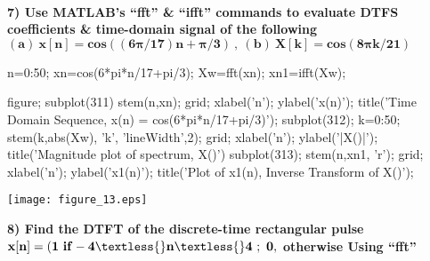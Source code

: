 \documentclass[12pt, onecolumn]{IEEEtran}
\begin{document}
\begin{par}
	\begin{flushleft}
		\textbf{ \\ 7) Use MATLAB’s “fft” \& “ifft” commands to evaluate DTFS coefficients \& time-domain signal of the following  $\mathbf{(a) \ x[n] = cos( (6\pi/17)n+\pi/3) \ , \ (b) \ X[k] = cos( 8\pi k/21 )}$}
	\end{flushleft}
\end{par}

\begin{matlabcode}
	n=0:50; %
	xn=cos(6*pi*n/17+pi/3); %
	Xw=fft(xn); %
	xn1=ifft(Xw); %
	
	figure; subplot(311)
	stem(n,xn); grid; %
	xlabel('n'); ylabel('x(n)');
	title('Time Domain Sequence, x(n) = cos(6*pi*n/17+pi/3)');
	subplot(312); k=0:50;
	stem(k,abs(Xw), 'k', 'lineWidth',2); grid; %
	xlabel('n'); ylabel('|X(\omega)|');
	title('Magnitude plot of spectrum, X(\omega)')
	subplot(313);
	stem(n,xn1, 'r'); grid; %
	xlabel('n'); ylabel('x1(n)');
	title('Plot of x1(n), Inverse Transform of X(\omega)');
\end{matlabcode}
\begin{center}
	\texttt{[image: figure\_13.eps]}
\end{center}

\begin{par}
	\begin{flushleft}
		\textbf{8) Find the DTFT of the discrete-time rectangular pulse $\mathbf{x[n] = ( 1 \ if -4 \textless{} n \textless{} 4 \ ; \ 0,}$ otherwise Using “fft”}
	\end{flushleft}
\end{par}
\end{document}
